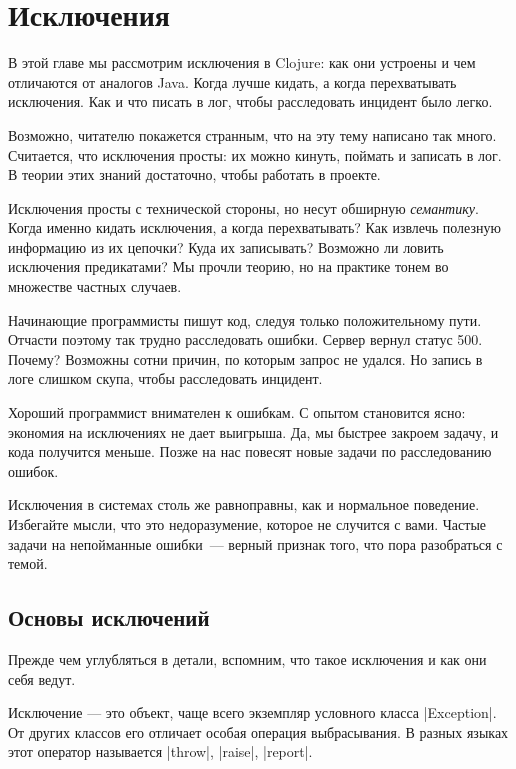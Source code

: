 \chapter{Исключения}

\begin{teaser}
В этой главе мы рассмотрим исключения в Clojure: как они устроены и чем
отличаются от аналогов Java. Когда лучше кидать, а когда перехватывать
исключения. Как и что писать в лог, чтобы расследовать инцидент было легко.
\end{teaser}

Возможно, читателю покажется странным, что на эту тему написано так
много. Считается, что исключения просты: их можно кинуть, поймать и записать в
лог. В теории этих знаний достаточно, чтобы работать в проекте.

Исключения просты с технической стороны, но несут обширную
\emph{семантику}. Когда именно кидать исключения, а когда перехватывать? Как
извлечь полезную информацию из их цепочки? Куда их записывать? Возможно ли
ловить исключения предикатами? Мы прочли теорию, но на практике тонем во
множестве частных случаев.

Начинающие программисты пишут код, следуя только положительному пути. Отчасти
поэтому так трудно расследовать ошибки. Сервер вернул статус 500. Почему?
Возможны сотни причин, по которым запрос не удался. Но запись в логе слишком
скупа, чтобы расследовать инцидент.

Хороший программист внимателен к ошибкам. С опытом становится ясно: экономия на
исключениях не дает выигрыша. Да, мы быстрее закроем задачу, и кода получится
меньше. Позже на нас повесят новые задачи по расследованию ошибок.

Исключения в системах столь же равноправны, как и нормальное поведение. Избегайте
мысли, что это недоразумение, которое не случится с вами. Частые задачи на
непойманные ошибки~--- верный признак того, что пора разобраться с темой.

\section{Основы исключений}

Прежде чем углубляться в детали, вспомним, что такое исключения и как они себя
ведут.

Исключение — это объект, чаще всего экземпляр условного класса \spverb|Exception|. От
других классов его отличает особая операция выбрасывания. В разных языках этот
оператор называется \spverb|throw|, \spverb|raise|, \spverb|report|.

